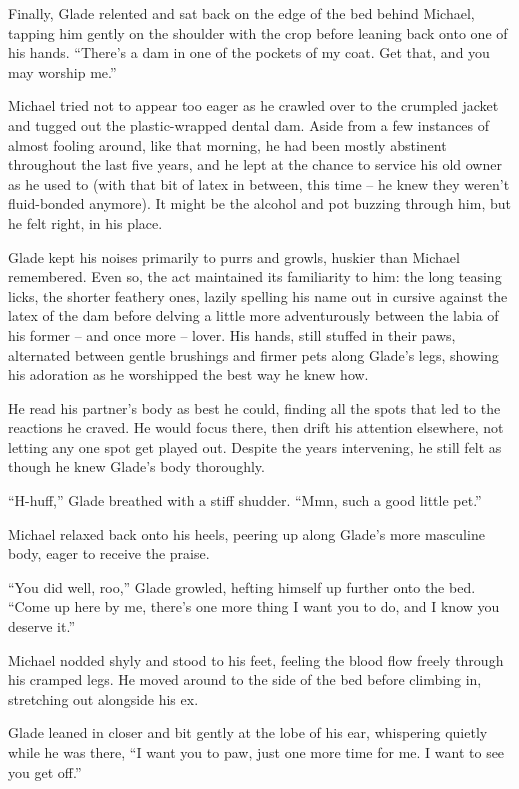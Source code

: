 \documentclass[12pt,letterpaper,oneside]{memoir}
\begin{document}
  Finally, Glade relented and sat back on the edge of the bed behind Michael, tapping him gently on the shoulder with the crop before leaning back onto one of his hands.  ``There's a dam in one of the pockets of my coat.  Get that, and you may worship me.''

  Michael tried not to appear too eager as he crawled over to the crumpled jacket and tugged out the plastic-wrapped dental dam.  Aside from a few instances of almost fooling around, like that morning, he had been mostly abstinent throughout the last five years, and he lept at the chance to service his old owner as he used to (with that bit of latex in between, this time -- he knew they weren't fluid-bonded anymore).  It might be the alcohol and pot buzzing through him, but he felt right, in his place.

  Glade kept his noises primarily to purrs and growls, huskier than Michael remembered.  Even so, the act maintained its familiarity to him: the long teasing licks, the shorter feathery ones, lazily spelling his name out in cursive against the latex of the dam before delving a little more adventurously between the labia of his former -- and once more -- lover.  His hands, still stuffed in their paws, alternated between gentle brushings and firmer pets along Glade's legs, showing his adoration as he worshipped the best way he knew how.

  He read his partner's body as best he could, finding all the spots that led to the reactions he craved.  He would focus there, then drift his attention elsewhere, not letting any one spot get played out.  Despite the years intervening, he still felt as though he knew Glade's body thoroughly.

  ``H-huff,'' Glade breathed with a stiff shudder.  ``Mmn, such a good little pet.''

  Michael relaxed back onto his heels, peering up along Glade's more masculine body, eager to receive the praise.

  ``You did well, roo,'' Glade growled, hefting himself up further onto the bed.  ``Come up here by me, there's one more thing I want you to do, and I know you deserve it.''

  Michael nodded shyly and stood to his feet, feeling the blood flow freely through his cramped legs.  He moved around to the side of the bed before climbing in, stretching out alongside his ex.

  Glade leaned in closer and bit gently at the lobe of his ear, whispering quietly while he was there, ``I want you to paw, just one more time for me. I want to see you get off.''
\end{document}
